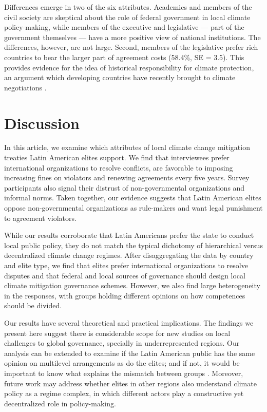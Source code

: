 \documentclass[a4paper,12pt]{article}
\begin{document}
Differences emerge in two of the six attributes. Academics and members of the civil society are skeptical about the role of federal government in local climate policy-making, while members of the executive and legislative --- part of the government themselves --- have a more positive view of national institutions. The differences, however, are not large. Second, members of the legislative prefer rich countries to bear the larger part of agreement costs (58.4\%, SE = 3.5). This provides evidence for the idea of historical responsibility for climate protection, an argument which developing countries have recently brought to climate negotiations \citep{muller2009differentiating, friman2015agreement}.

\section{Discussion}%
\label{sec:discussion}

In this article, we examine which attributes of local climate change mitigation treaties Latin American elites support. We find that interviewees prefer international organizations to resolve conflicts, are favorable to imposing increasing fines on violators and renewing agreements every five years. Survey participants also signal their distrust of non-governmental organizations and informal norms. Taken together, our evidence suggests that Latin American elites oppose non-governmental organizations as rule-makers and want legal punishment to agreement violators.

While our results corroborate that Latin Americans prefer the state to conduct local public policy, they do not match the typical dichotomy of hierarchical versus decentralized climate change regimes. After disaggregating the data by country and elite type, we find that elites prefer international organizations to resolve disputes and that federal and local sources of governance should design local climate mitigation governance schemes. However, we also find large heterogeneity in the responses, with groups holding different opinions on how competences should be divided.

Our results have several theoretical and practical implications. The findings we present here suggest there is considerable scope for new studies on local challenges to global governance, specially in underrepresented regions. Our analysis can be extended to examine if the Latin American public has the same opinion on multilevel arrangements as do the elites; and if not, it would be important to know what explains the mismatch between groups \citep{luna2005political}. Moreover, future work may address whether elites in other regions also understand climate policy as a regime complex, in which different actors play a constructive yet decentralized role in policy-making.
\end{document}
